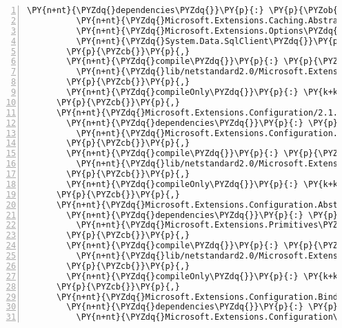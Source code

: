 \begin{Verbatim}[commandchars=\\\{\},numbers=left,firstnumber=1,stepnumber=1,numberblanklines=0]
        \PY{n+nt}{\PYZdq{}dependencies\PYZdq{}}\PY{p}{:} \PY{p}{\PYZob{}}
          \PY{n+nt}{\PYZdq{}Microsoft.Extensions.Caching.Abstractions\PYZdq{}}\PY{p}{:} \PY{l+s+s2}{\PYZdq{}2.1.0\PYZhy{}rc1\PYZhy{}final\PYZdq{}}\PY{p}{,}
          \PY{n+nt}{\PYZdq{}Microsoft.Extensions.Options\PYZdq{}}\PY{p}{:} \PY{l+s+s2}{\PYZdq{}2.1.0\PYZhy{}rc1\PYZhy{}final\PYZdq{}}\PY{p}{,}
          \PY{n+nt}{\PYZdq{}System.Data.SqlClient\PYZdq{}}\PY{p}{:} \PY{l+s+s2}{\PYZdq{}4.5.0\PYZhy{}rc1\PYZdq{}}
        \PY{p}{\PYZcb{}}\PY{p}{,}
        \PY{n+nt}{\PYZdq{}compile\PYZdq{}}\PY{p}{:} \PY{p}{\PYZob{}}
          \PY{n+nt}{\PYZdq{}lib/netstandard2.0/Microsoft.Extensions.Caching.SqlServer.dll\PYZdq{}}\PY{p}{:} \PY{p}{\PYZob{}}\PY{p}{\PYZcb{}}
        \PY{p}{\PYZcb{}}\PY{p}{,}
        \PY{n+nt}{\PYZdq{}compileOnly\PYZdq{}}\PY{p}{:} \PY{k+kc}{true}
      \PY{p}{\PYZcb{}}\PY{p}{,}
      \PY{n+nt}{\PYZdq{}Microsoft.Extensions.Configuration/2.1.0\PYZhy{}rc1\PYZhy{}final\PYZdq{}}\PY{p}{:} \PY{p}{\PYZob{}}
        \PY{n+nt}{\PYZdq{}dependencies\PYZdq{}}\PY{p}{:} \PY{p}{\PYZob{}}
          \PY{n+nt}{\PYZdq{}Microsoft.Extensions.Configuration.Abstractions\PYZdq{}}\PY{p}{:} \PY{l+s+s2}{\PYZdq{}2.1.0\PYZhy{}rc1\PYZhy{}final\PYZdq{}}
        \PY{p}{\PYZcb{}}\PY{p}{,}
        \PY{n+nt}{\PYZdq{}compile\PYZdq{}}\PY{p}{:} \PY{p}{\PYZob{}}
          \PY{n+nt}{\PYZdq{}lib/netstandard2.0/Microsoft.Extensions.Configuration.dll\PYZdq{}}\PY{p}{:} \PY{p}{\PYZob{}}\PY{p}{\PYZcb{}}
        \PY{p}{\PYZcb{}}\PY{p}{,}
        \PY{n+nt}{\PYZdq{}compileOnly\PYZdq{}}\PY{p}{:} \PY{k+kc}{true}
      \PY{p}{\PYZcb{}}\PY{p}{,}
      \PY{n+nt}{\PYZdq{}Microsoft.Extensions.Configuration.Abstractions/2.1.0\PYZhy{}rc1\PYZhy{}final\PYZdq{}}\PY{p}{:} \PY{p}{\PYZob{}}
        \PY{n+nt}{\PYZdq{}dependencies\PYZdq{}}\PY{p}{:} \PY{p}{\PYZob{}}
          \PY{n+nt}{\PYZdq{}Microsoft.Extensions.Primitives\PYZdq{}}\PY{p}{:} \PY{l+s+s2}{\PYZdq{}2.1.0\PYZhy{}rc1\PYZhy{}final\PYZdq{}}
        \PY{p}{\PYZcb{}}\PY{p}{,}
        \PY{n+nt}{\PYZdq{}compile\PYZdq{}}\PY{p}{:} \PY{p}{\PYZob{}}
          \PY{n+nt}{\PYZdq{}lib/netstandard2.0/Microsoft.Extensions.Configuration.Abstractions.dll\PYZdq{}}\PY{p}{:} \PY{p}{\PYZob{}}\PY{p}{\PYZcb{}}
        \PY{p}{\PYZcb{}}\PY{p}{,}
        \PY{n+nt}{\PYZdq{}compileOnly\PYZdq{}}\PY{p}{:} \PY{k+kc}{true}
      \PY{p}{\PYZcb{}}\PY{p}{,}
      \PY{n+nt}{\PYZdq{}Microsoft.Extensions.Configuration.Binder/2.1.0\PYZhy{}rc1\PYZhy{}final\PYZdq{}}\PY{p}{:} \PY{p}{\PYZob{}}
        \PY{n+nt}{\PYZdq{}dependencies\PYZdq{}}\PY{p}{:} \PY{p}{\PYZob{}}
          \PY{n+nt}{\PYZdq{}Microsoft.Extensions.Configuration\PYZdq{}}\PY{p}{:} \PY{l+s+s2}{\PYZdq{}2.1.0\PYZhy{}rc1\PYZhy{}final\PYZdq{}}

\end{Verbatim}

